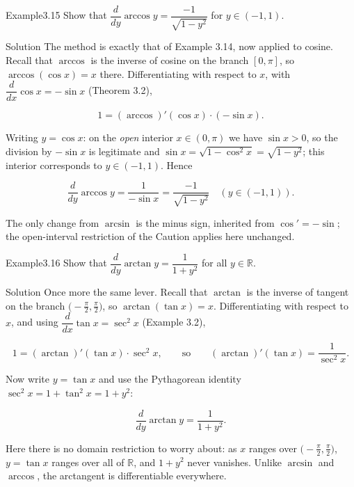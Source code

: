 \begin{hkworkedexample}
\begin{hkexample}{Example}{3.15}{}
Show that \(\dfrac{d}{dy}\arccos y = \dfrac{-1}{\sqrt{1 - y^{2}}}\) for \(y \in (-1, 1)\).
\end{hkexample}
\begin{hksolution}{Solution}{}{}
The method is exactly that of Example 3.14, now applied to cosine. Recall that \(\arccos\) is the inverse of cosine on the branch \([0, \pi]\), so \(\arccos(\cos x) = x\) there. Differentiating with respect to \(x\), with \(\dfrac{d}{dx}\cos x = -\sin x\) (Theorem 3.2),

\[ 1 = (\arccos)'(\cos x)\cdot(-\sin x). \]

Writing \(y = \cos x\): on the \emph{open} interior \(x \in (0, \pi)\) we have \(\sin x > 0\), so the division by \(-\sin x\) is legitimate and \(\sin x = \sqrt{1 - \cos^{2} x} = \sqrt{1 - y^{2}}\); this interior corresponds to \(y \in (-1, 1)\). Hence

\[ \frac{d}{dy}\arccos y = \frac{1}{-\sin x} = \frac{-1}{\sqrt{1 - y^{2}}} \quad (y \in (-1, 1)). \]

The only change from \(\arcsin\) is the minus sign, inherited from \(\cos' = -\sin\); the open-interval restriction of the Caution applies here unchanged.
\end{hksolution}
\end{hkworkedexample}
\begin{hkworkedexample}
\begin{hkexample}{Example}{3.16}{}
Show that \(\dfrac{d}{dy}\arctan y = \dfrac{1}{1 + y^{2}}\) for all \(y \in \mathbb{R}\).
\end{hkexample}
\begin{hksolution}{Solution}{}{}
Once more the same lever. Recall that \(\arctan\) is the inverse of tangent on the branch \(\bigl(-\tfrac{\pi}{2}, \tfrac{\pi}{2}\bigr)\), so \(\arctan(\tan x) = x\). Differentiating with respect to \(x\), and using \(\dfrac{d}{dx}\tan x = \sec^{2} x\) (Example 3.2),

\[ 1 = (\arctan)'(\tan x)\cdot\sec^{2} x, \qquad\text{so}\qquad (\arctan)'(\tan x) = \frac{1}{\sec^{2} x}. \]

Now write \(y = \tan x\) and use the Pythagorean identity \(\sec^{2} x = 1 + \tan^{2} x = 1 + y^{2}\):

\[ \frac{d}{dy}\arctan y = \frac{1}{1 + y^{2}}. \]

Here there is no domain restriction to worry about: as \(x\) ranges over \(\bigl(-\tfrac{\pi}{2}, \tfrac{\pi}{2}\bigr)\), \(y = \tan x\) ranges over all of \(\mathbb{R}\), and \(1 + y^{2}\) never vanishes. Unlike \(\arcsin\) and \(\arccos\), the arctangent is differentiable everywhere.
\end{hksolution}
\end{hkworkedexample}
